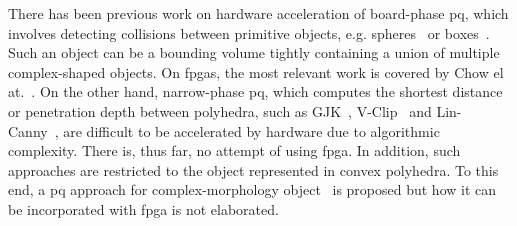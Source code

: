 There has been previous work on hardware acceleration of board-phase \gls{pq}, which involves detecting collisions between primitive objects, e.g. spheres~\cite{benallegue09} or boxes~\cite{zhang07}. 
Such an object can be a bounding volume tightly containing a union of multiple complex-shaped objects. 
On \glspl{fpga}, the most relevant work is covered by Chow el at.~\cite{chow11}.
On the other hand, narrow-phase \gls{pq}, which computes the shortest distance or penetration depth between polyhedra, such as GJK~\cite{gilbert88}, V-Clip~\cite{mirtich98} and Lin-Canny~\cite{lin91}, are difficult to be accelerated by hardware due to algorithmic complexity. 
There is, thus far, no attempt of using \gls{fpga}. 
In addition, such approaches are restricted to the object represented in convex polyhedra. 
To this end, a \gls{pq} approach for complex-morphology object~\cite{kwok13} is proposed but how it can be incorporated with \gls{fpga} is not elaborated.



